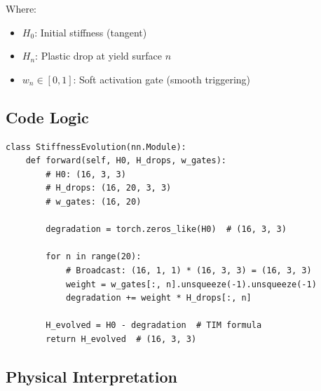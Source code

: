 \documentclass[11pt,a4paper]{article}
\begin{document}
Where:
\begin{itemize}
  \item $H_0$: Initial stiffness (tangent)
  \item $H_n$: Plastic drop at yield surface $n$
  \item $w_n \in [0, 1]$: Soft activation gate (smooth triggering)
\end{itemize}

\subsection{Code Logic}

\begin{lstlisting}[caption=Stiffness Evolution]
class StiffnessEvolution(nn.Module):
    def forward(self, H0, H_drops, w_gates):
        # H0: (16, 3, 3)
        # H_drops: (16, 20, 3, 3)
        # w_gates: (16, 20)

        degradation = torch.zeros_like(H0)  # (16, 3, 3)

        for n in range(20):
            # Broadcast: (16, 1, 1) * (16, 3, 3) = (16, 3, 3)
            weight = w_gates[:, n].unsqueeze(-1).unsqueeze(-1)
            degradation += weight * H_drops[:, n]

        H_evolved = H0 - degradation  # TIM formula
        return H_evolved  # (16, 3, 3)
\end{lstlisting}

\subsection{Physical Interpretation}

\begin{figure}[H]
\centering
{}
\end{figure}
\end{document}
